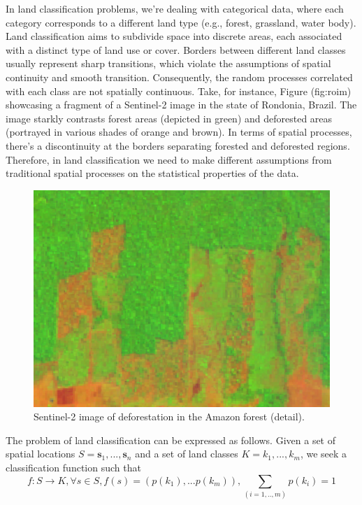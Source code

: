 \documentclass[
  shortnames]{jss}
\begin{document}
In land classification problems, we're dealing with categorical data, where each category corresponds to a different land type (e.g., forest, grassland, water body). Land classification aims to subdivide space into discrete areas, each associated with a distinct type of land use or cover. Borders between different land classes usually represent sharp transitions, which violate the assumptions of spatial continuity and smooth transition. Consequently, the random processes correlated with each class are not spatially continuous. Take, for instance, Figure \citet{ref}(fig:roim) showcasing a fragment of a Sentinel-2 image in the state of Rondonia, Brazil. The image starkly contrasts forest areas (depicted in green) and deforested areas (portrayed in various shades of orange and brown). In terms of spatial processes, there's a discontinuity at the borders separating forested and deforested regions. Therefore, in land classification we need to make different assumptions from traditional spatial processes on the statistical properties of the data.

\begin{CodeChunk}
\begin{figure}[h]

{\centering \includegraphics[width=4.6in]{images/rondonia_image} 

}

\caption[Sentinel-2 image of deforestation in the Amazon forest (detail)]{Sentinel-2 image of deforestation in the Amazon forest (detail).}\label{fig:roim}
\end{figure}
\end{CodeChunk}

The problem of land classification can be expressed as follows. Given a set of spatial locations \(S = {\mathbf{s}_1, ..., \mathbf{s}_n}\) and a set of land classes \(K = {k_1, ..., k_m}\), we seek a classification function such that
\begin{equation}
f: S \to K, \forall s \in S, f(s) = (p(k_1), ...p(k_m)), \sum_{(i = 1,..,m)}p(k_i) = 1
\end{equation}
\end{document}
